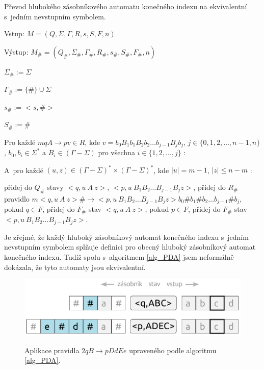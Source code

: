 \begin{Alg} \label{alg_PDA}
Převod hlubokého zásobníkového automatu konečného indexu na ekvivalentní s~jedním nevstupním symbolem.

\begin{list}{}{\setlength\parsep{0cm} \setlength\itemsep{0cm} \setlength\leftmargin{1em}}
   \item Vstup: $M = (Q,\Sigma,\Gamma, R, s, S, F, n)$ 
   \item Výstup: $M_\# = (Q_\#,{\Sigma}_\#,{\Gamma}_\#, R_\#, s_\#,  S_\#, F_\#, n)$ \medskip
  
  \item ${\Sigma}_\# := \Sigma$
  \item ${\Gamma}_\# :=\{\#\} \cup \Sigma$
  \item $s_\# := <s,\#>$
  \item $S_\# := \# $ \medskip

  \item Pro každé $mqA \rightarrow pv \in R$, kde $v = b_0 B_1 b_1 B_2 b_2 \dots b_{j-1} B_{j} b_j$, $j \in \{0,1,2,\dots,n-1,n\}$, $b_0,b_i \in {\Sigma}^*$ a $B_i \in (\Gamma - \Sigma)$ pro všechna $i \in \{1,2,\dots,j\}$ : \smallskip

  \subitem A~pro každé $(u,z) \in (\Gamma - \Sigma)^* \times (\Gamma - \Sigma)^*$, kde $|u|=m-1$, $|z|\le n-m$ : \smallskip

  \subsubitem přidej do $Q_\#$ stavy $<q, u~A~z>$, $<p, u~B_1 B_2 \dots B_{j-1} B_{j} z>$,
  \subsubitem přidej do $R_\#$ pravidlo $m <q, u~A~z> \# \rightarrow <p, u~B_1 B_2 \dots B_{j-1} B_{j} z> b_0 \# b_1 \# b_2 \dots b_{j-1} \# b_j $,
  \subsubitem pokud $q \in F$, přidej do $F_\#$ stav $<q, u~A~z>$,
  \subsubitem pokud $p \in F$, přidej do $F_\#$ stav $<p, u~B_1 B_2 \dots B_{j-1} B_{j} z>$.

\end{list}
\end{Alg}

Je zřejmé, že každý hluboký zásobníkový automat konečného indexu s~jedním nevstupním symbolem splňuje definici pro obecný hluboký zásobníkový automat konečného indexu. Tudíž spolu s~algoritmem \ref{alg_PDA} jsem neformálně dokázala, že tyto automaty jsou ekvivalentní.

\begin{figure}[ht]
\centering
\includegraphics{img/bp_pda03.eps} \bigskip \\
\caption{Aplikace pravidla $2 q B \rightarrow p DdEe$ upraveného podle algoritmu \ref{alg_PDA}.}
\end{figure}


